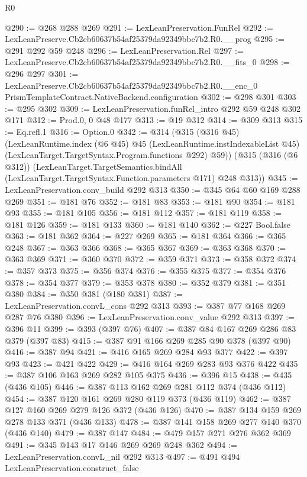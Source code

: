 \begin{lexlean}{R0}
\begin{coremodule}
@290 := @268 @288 @269
@291 := LexLeanPreservation.FunRel
@292 := LexLeanPreserve.Cb2cb60637b54af25379da92349bbc7b2.R0.__prog
@295 := @291 @292 @59 @248
@296 := LexLeanPreservation.Rel
@297 := LexLeanPreserve.Cb2cb60637b54af25379da92349bbc7b2.R0.__fits_0
@298 := @296 @297
@301 := LexLeanPreserve.Cb2cb60637b54af25379da92349bbc7b2.R0.__enc_0
    PrismTemplateContract.NativeBackend.configuration
@302 := @298 @301
@303 := @295 @302
@309 := LexLeanPreservation.funRel_intro @292 @59 @248 @302 @171
@312 := Prod.{0, 0} @48 @177
@313 := @19 @312
@314 := @309 @313
@315 := Eq.refl.{1}
@316 := Option.{0}
@342 := @314
    (@315
      (@316 @45)
      (LexLeanRuntime.index
        (@6 @45)
        @45
        (LexLeanRuntime.instIndexableList @45)
        (LexLeanTarget.TargetSyntax.Program.functions @292)
        @59))
    (@315
      (@316 (@6 @312))
      (LexLeanTarget.TargetSemantics.bindAll
        (LexLeanTarget.TargetSyntax.Function.parameters @171)
        @248
        @313))
@345 := LexLeanPreservation.conv_build @292 @313
@350 := @345 @64 @60 @169 @288 @269
@351 := @181 @76
@352 := @181 @83
@353 := @181 @90
@354 := @181 @93
@355 := @181 @105
@356 := @181 @112
@357 := @181 @119
@358 := @181 @126
@359 := @181 @133
@360 := @181 @140
@362 := @227 Bool.false
@363 := @181 @362
@364 := @227 @269
@365 := @181 @364
@366 := @365 @248
@367 := @363 @366
@368 := @365 @367
@369 := @363 @368
@370 := @363 @369
@371 := @360 @370
@372 := @359 @371
@373 := @358 @372
@374 := @357 @373
@375 := @356 @374
@376 := @355 @375
@377 := @354 @376
@378 := @354 @377
@379 := @353 @378
@380 := @352 @379
@381 := @351 @380
@384 := @350 @381 (@180 @381)
@387 := LexLeanPreservation.convL_cons @292 @313
@393 := @387 @77 @168 @269 @287 @76 @380
@396 := LexLeanPreservation.conv_value @292 @313
@397 := @396 @11
@399 := @393 (@397 @76)
@407 := @387 @84 @167 @269 @286 @83 @379 (@397 @83)
@415 := @387 @91 @166 @269 @285 @90 @378 (@397 @90)
@416 := @387 @94
@421 := @416 @165 @269 @284 @93 @377
@422 := @397 @93
@423 := @421 @422
@429 := @416 @164 @269 @283 @93 @376 @422
@435 := @387 @106 @163 @269 @282 @105 @375
@436 := @396 @15
@438 := @435 (@436 @105)
@446 := @387 @113 @162 @269 @281 @112 @374 (@436 @112)
@454 := @387 @120 @161 @269 @280 @119 @373 (@436 @119)
@462 := @387 @127 @160 @269 @279 @126 @372 (@436 @126)
@470 := @387 @134 @159 @269 @278 @133 @371 (@436 @133)
@478 := @387 @141 @158 @269 @277 @140 @370 (@436 @140)
@479 := @387 @147
@484 := @479 @157 @271 @276 @362 @369
@491 := @345 @143 @17 @146 @269 @269 @248 @362
@494 := LexLeanPreservation.convL_nil @292 @313
@497 := @491 @494 LexLeanPreservation.construct_false

\end{coremodule}
\end{lexlean}
